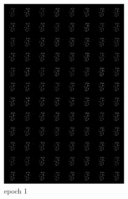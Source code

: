 \documentclass[a4paper]{article}
\theoremstyle{definition}
\newenvironment{soln}{
	\leavevmode\color{blue}\ignorespaces
}{}
\begin{document}
\begin{enumerate} [label=(\alph*)]
\begin{soln}
\begin{soln}
				\begin{figure}[H]
					\centering
					\begin{subfigure}[b]{0.3\textwidth}
						\centering
						\includegraphics[width=\textwidth]{../outputs-c-nadm-smooth/gen_img1.png}
						\caption{epoch 1}
					\end{subfigure}
					\hfill
					\begin{subfigure}[b]{0.3\textwidth}
						\centering

\end{subfigure}
\end{figure}
\end{soln}
\end{soln}
\end{enumerate}
\end{document}
